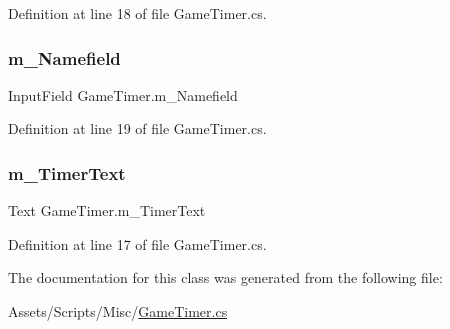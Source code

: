 Definition at line 18 of file Game\+Timer.\+cs.

\mbox{\label{class_game_timer_a07186836d1ad021648e25653989741a1}} 
\subsubsection{\texorpdfstring{m\+\_\+\+Namefield}{m\_Namefield}}
{\footnotesize\ttfamily Input\+Field Game\+Timer.\+m\+\_\+\+Namefield}



Definition at line 19 of file Game\+Timer.\+cs.

\mbox{\label{class_game_timer_a047f25d6ea0dbce86f59db934c7f4601}} 
\subsubsection{\texorpdfstring{m\+\_\+\+Timer\+Text}{m\_TimerText}}
{\footnotesize\ttfamily Text Game\+Timer.\+m\+\_\+\+Timer\+Text}



Definition at line 17 of file Game\+Timer.\+cs.



The documentation for this class was generated from the following file\+:\begin{DoxyCompactItemize}
\item 
Assets/\+Scripts/\+Misc/\mbox{\hyperlink{_game_timer_8cs}{Game\+Timer.\+cs}}\end{DoxyCompactItemize}
